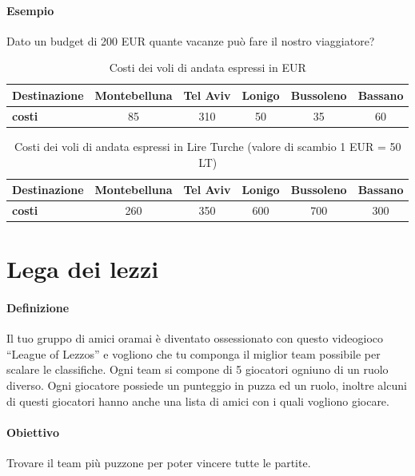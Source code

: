     \paragraph{Esempio} Dato un budget di 200 EUR quante vacanze può fare il nostro viaggiatore?

    \begin{table}[h!]
        \centering
        \caption{Costi dei voli di andata espressi in EUR}
        \label{tab:costi_voli}
        \begin{tabular}{|l|c|c|c|c|c|}
        \hline
            \textbf{Destinazione} & \textbf{Montebelluna} & \textbf{Tel Aviv} & \textbf{Lonigo} & \textbf{Bussoleno} & \textbf{Bassano} \\ \hline
            \textbf{costi} & 85 & 310 & 50 & 35 & 60 \\ \hline
        \end{tabular}
    \end{table}

    \begin{table}[h!]
        \centering
        \caption{Costi dei voli di andata espressi in Lire Turche (valore di scambio 1 EUR = 50 LT)}
        \label{tab:costi_voli}
        \begin{tabular}{|l|c|c|c|c|c|}
        \hline
            \textbf{Destinazione} & \textbf{Montebelluna} & \textbf{Tel Aviv} & \textbf{Lonigo} & \textbf{Bussoleno} & \textbf{Bassano} \\ \hline
            \textbf{costi} & 260 & 350 & 600 & 700 & 300 \\ \hline
        \end{tabular}
    \end{table}

\newpage
\thispagestyle{chapterInit}
\section*{Lega dei lezzi}
    \paragraph{Definizione} Il tuo gruppo di amici oramai è diventato ossessionato con questo videogioco ``League of Lezzos'' e vogliono che tu componga il miglior team possibile per scalare le classifiche. Ogni team si compone di 5 giocatori ogniuno di un ruolo diverso. Ogni giocatore possiede un punteggio in puzza ed un ruolo, inoltre alcuni di questi giocatori hanno anche una lista di amici con i quali vogliono giocare. 
    \paragraph{Obiettivo} Trovare il team più puzzone per poter vincere tutte le partite.

